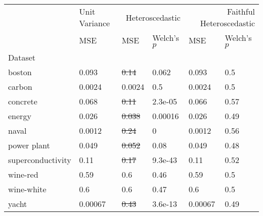 \begin{tabular}{l|l|ll|ll}
\toprule
 & Unit Variance & \multicolumn{2}{r}{Heteroscedastic} & \multicolumn{2}{r}{Faithful Heteroscedastic} \\
 & MSE & MSE & Welch's $p$ & MSE & Welch's $p$ \\
Dataset &  &  &  &  &  \\
\midrule
boston & 0.093 & \sout{0.14} & 0.062 & 0.093 & 0.5 \\
carbon & 0.0024 & 0.0024 & 0.5 & 0.0024 & 0.5 \\
concrete & 0.068 & \sout{0.11} & 2.3e-05 & 0.066 & 0.57 \\
energy & 0.026 & \sout{0.038} & 0.00016 & 0.026 & 0.49 \\
naval & 0.0012 & \sout{0.24} & 0 & 0.0012 & 0.56 \\
power plant & 0.049 & \sout{0.052} & 0.08 & 0.049 & 0.48 \\
superconductivity & 0.11 & \sout{0.17} & 9.3e-43 & 0.11 & 0.52 \\
wine-red & 0.59 & 0.6 & 0.46 & 0.59 & 0.5 \\
wine-white & 0.6 & 0.6 & 0.47 & 0.6 & 0.5 \\
yacht & 0.00067 & \sout{0.43} & 3.6e-13 & 0.00067 & 0.49 \\
\bottomrule
\end{tabular}
